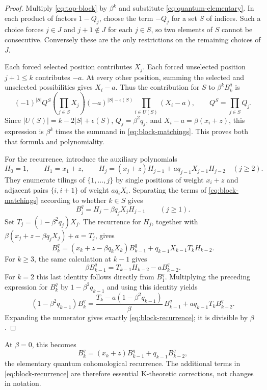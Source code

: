\documentclass[11pt]{article}
\begin{document}
\begin{proof}
Multiply \eqref{eq:top-block} by $\beta^k$ and substitute
\eqref{eq:quantum-elementary}. In each product of factors
$1-Q_j$, choose the term $-Q_j$ for a set $S$ of indices.
Such a choice forces $j\in J$ and $j+1\notin J$ for each
$j\in S$, so two elements of $S$ cannot be consecutive.
Conversely these are the only restrictions on the remaining
choices of $J$.

Each forced selected position contributes $X_j$.
Each forced unselected position $j+1\leq k$ contributes $-a$.
At every other position, summing the selected and unselected
possibilities gives $X_i-a$. Thus the contribution for $S$ to
$\beta^kB_k^q$ is
\[
 (-1)^{|S|}Q^S
 \left(\prod_{j\in S}X_j\right)
 (-a)^{|S|-\epsilon(S)}
 \prod_{i\in U(S)}(X_i-a),
 \qquad Q^S=\prod_{j\in S}Q_j.
\]
Since $|U(S)|=k-2|S|+\epsilon(S)$,
$Q_j=\beta^2q_j$, and $X_i-a=\beta(x_i+z)$, this expression is
$\beta^k$ times the summand in \eqref{eq:block-matchings}.
This proves both that formula and polynomiality.

For the recurrence, introduce the auxiliary polynomials
\[
 H_0=1,\qquad H_1=x_1+z,\qquad
 H_j=(x_j+z)H_{j-1}+a q_{j-1}X_{j-1}H_{j-2}\quad(j\geq2).
\]
They enumerate tilings of $\{1,\ldots,j\}$ by single positions
of weight $x_i+z$ and adjacent pairs $\{i,i+1\}$ of weight
$a q_iX_i$. Separating the terms of
\eqref{eq:block-matchings} according to whether $k\in S$ gives
\begin{equation}\label{eq:block-auxiliary}
 B_j^q=H_j-\beta q_jX_jH_{j-1}\qquad(j\geq1).
\end{equation}
Set $T_j=(1-\beta^2q_j)X_j$.
The recurrence for $H_j$, together with
$\beta(x_j+z-\beta q_jX_j)+a=T_j$, gives
\[
 B_k^q=(x_k+z-\beta q_kX_k)B_{k-1}^q
               +q_{k-1}X_{k-1}T_kH_{k-2}.
\]
For $k\geq3$, the same calculation at $k-1$ gives
\[
 \beta B_{k-1}^q
       =T_{k-1}H_{k-2}-aB_{k-2}^q.
\]
For $k=2$ this last identity follows directly from $B_1^q$.
Multiplying the preceding expression for $B_k^q$ by
$1-\beta^2q_{k-1}$ and using this identity yields
\[
 (1-\beta^2q_{k-1})B_k^q
   =\frac{T_k-a(1-\beta^2q_{k-1})}{\beta}\,B_{k-1}^q
       +a q_{k-1}T_kB_{k-2}^q.
\]
Expanding the numerator gives exactly
\eqref{eq:block-recurrence}; it is divisible by $\beta$.
\end{proof}

At $\beta=0$, this becomes
\[
 B_k^q=(x_k+z)B_{k-1}^q+q_{k-1}B_{k-2}^q,
\]
the elementary quantum cohomological recurrence. The additional
terms in \eqref{eq:block-recurrence} are therefore essential
K-theoretic corrections, not changes in notation.
\end{document}
